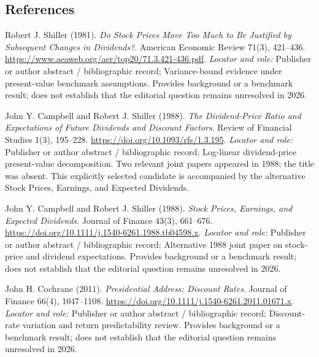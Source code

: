 \documentclass[11pt,a4paper]{article}
\begin{document}
\subsection*{References}

\begin{enumerate}[label={[S\arabic*]},leftmargin=*]

\item Robert J. Shiller (1981). \emph{Do Stock Prices Move Too Much to Be Justified by Subsequent Changes in Dividends?}. American Economic Review 71(3), 421–436. \url{https://www.aeaweb.org/aer/top20/71.3.421-436.pdf}.
\textit{Locator and role:} Publisher or author abstract / bibliographic record; Variance-bound evidence under present-value benchmark assumptions. Provides background or a benchmark result; does not establish that the editorial question remains unresolved in 2026.

\item John Y. Campbell and Robert J. Shiller (1988). \emph{The Dividend-Price Ratio and Expectations of Future Dividends and Discount Factors}. Review of Financial Studies 1(3), 195–228. \url{https://doi.org/10.1093/rfs/1.3.195}.
\textit{Locator and role:} Publisher or author abstract / bibliographic record; Log-linear dividend-price present-value decomposition. Two relevant joint papers appeared in 1988; the title was absent. This explicitly selected candidate is accompanied by the alternative Stock Prices, Earnings, and Expected Dividends.

\item John Y. Campbell and Robert J. Shiller (1988). \emph{Stock Prices, Earnings, and Expected Dividends}. Journal of Finance 43(3), 661–676. \url{https://doi.org/10.1111/j.1540-6261.1988.tb04598.x}.
\textit{Locator and role:} Publisher or author abstract / bibliographic record; Alternative 1988 joint paper on stock-price and dividend expectations. Provides background or a benchmark result; does not establish that the editorial question remains unresolved in 2026.

\item John H. Cochrane (2011). \emph{Presidential Address: Discount Rates}. Journal of Finance 66(4), 1047–1108. \url{https://doi.org/10.1111/j.1540-6261.2011.01671.x}.
\textit{Locator and role:} Publisher or author abstract / bibliographic record; Discount-rate variation and return predictability review. Provides background or a benchmark result; does not establish that the editorial question remains unresolved in 2026.

\end{enumerate}
\end{document}
